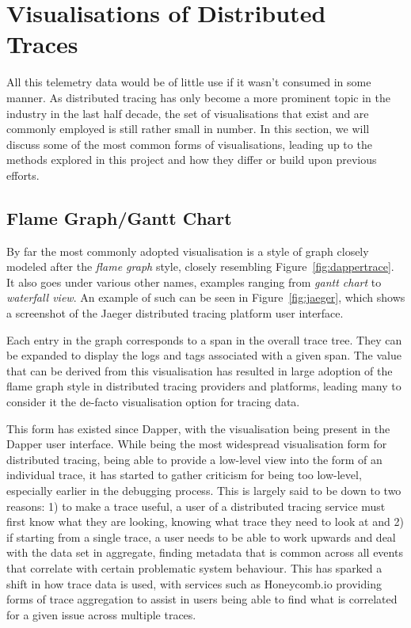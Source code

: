 \documentclass[12pt,pdftex,titlepage]{report}
\begin{document}
        \newpage
        \section{Visualisations of Distributed Traces}
            All this telemetry data would be of little use if it wasn't consumed in some manner. As distributed tracing has only become a more
            prominent topic in the industry in the last half decade, the set of visualisations that exist and are commonly employed is still rather
            small in number. In this section, we will discuss some of the most common forms of visualisations, leading up to the methods explored 
            in this project and how they differ or build upon previous efforts.
        
            \subsection{Flame Graph/Gantt Chart}
                By far the most commonly adopted visualisation is a style of graph closely modeled after the \textit{flame graph}\cite{lightsteptrace}
                \cite{datadogtrace} style, closely resembling Figure~\ref{fig:dappertrace}. It also goes under various other names, 
                examples ranging from \textit{gantt chart}\cite{yuritrace} to \textit{waterfall view}\cite{honeycombtrace}. An example of 
                such can be seen in Figure~\ref{fig:jaeger}, which shows a screenshot of the Jaeger distributed tracing platform user interface. 
                
                Each entry in the graph corresponds to a span in the overall trace tree. They can be expanded to display the logs and tags associated with a 
                given span. The value that can be derived from this visualisation has resulted in large adoption of the flame graph style in distributed 
                tracing providers and platforms, leading many to consider it the de-facto visualisation option for tracing data.

                This form has existed since Dapper, with the visualisation being present in the Dapper user interface. While being the most widespread visualisation
                form for distributed tracing, being able to provide a low-level view into the form of an individual trace, it has started to gather criticism for being
                too low-level, especially earlier in the debugging process. This is largely said to be down to two reasons: 1) to make a trace useful, a user of a distributed
                tracing service must first know what they are looking, knowing what trace they need to look at and 2) if starting from a single trace, a user needs to be able to work
                upwards and deal with the data set in aggregate, finding metadata that is common across all events that correlate with certain problematic system behaviour. This has
                sparked a shift in how trace data is used, with services such as Honeycomb.io providing forms of trace aggregation to assist in users being able to find what is 
                correlated for a given issue across multiple traces\cite{traceaggregate}.
        
\end{document}
